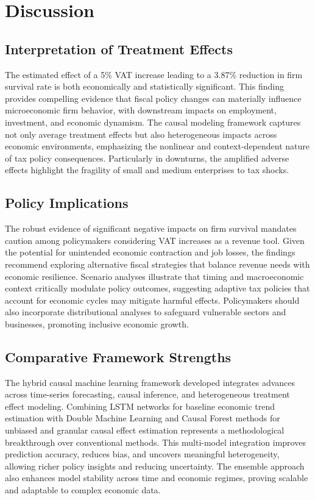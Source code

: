 \section{Discussion}\label{sec:discussion}

\subsection{Interpretation of Treatment Effects}
The estimated effect of a 5\% VAT increase leading to a 3.87\% reduction in firm survival rate is both economically and statistically significant. This finding provides compelling evidence that fiscal policy changes can materially influence microeconomic firm behavior, with downstream impacts on employment, investment, and economic dynamism. The causal modeling framework captures not only average treatment effects but also heterogeneous impacts across economic environments, emphasizing the nonlinear and context-dependent nature of tax policy consequences. Particularly in downturns, the amplified adverse effects highlight the fragility of small and medium enterprises to tax shocks.

\subsection{Policy Implications}
The robust evidence of significant negative impacts on firm survival mandates caution among policymakers considering VAT increases as a revenue tool. Given the potential for unintended economic contraction and job losses, the findings recommend exploring alternative fiscal strategies that balance revenue needs with economic resilience. Scenario analyses illustrate that timing and macroeconomic context critically modulate policy outcomes, suggesting adaptive tax policies that account for economic cycles may mitigate harmful effects. Policymakers should also incorporate distributional analyses to safeguard vulnerable sectors and businesses, promoting inclusive economic growth.

\subsection{Comparative Framework Strengths}
The hybrid causal machine learning framework developed integrates advances across time-series forecasting, causal inference, and heterogeneous treatment effect modeling. Combining LSTM networks for baseline economic trend estimation with Double Machine Learning and Causal Forest methods for unbiased and granular causal effect estimation represents a methodological breakthrough over conventional methods. This multi-model integration improves prediction accuracy, reduces bias, and uncovers meaningful heterogeneity, allowing richer policy insights and reducing uncertainty. The ensemble approach also enhances model stability across time and economic regimes, proving scalable and adaptable to complex economic data.

